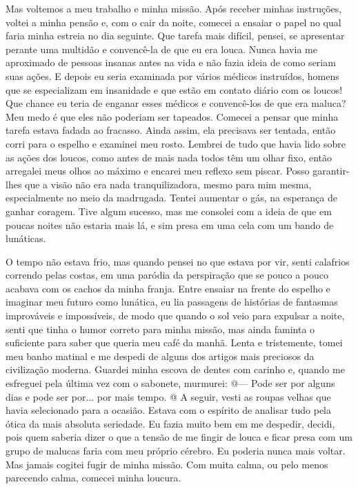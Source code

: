 Mas voltemos a meu trabalho e minha missão. Após receber minhas
instruções, voltei a minha pensão e, com o cair da noite, comecei a
ensaiar o papel no qual faria minha estreia no dia seguinte. Que tarefa
mais difícil, pensei, se apresentar perante uma multidão e convencê-la
de que eu era louca. Nunca havia me aproximado de pessoas insanas antes
na vida e não fazia ideia de como seriam suas ações. E depois eu seria
examinada por vários médicos instruídos, homens que se especializam em
insanidade e que estão em contato diário com os loucos! Que chance eu
teria de enganar esses médicos e convencê-los de que era maluca? Meu
medo é que eles não poderiam ser tapeados. Comecei a pensar que minha
tarefa estava fadada ao fracasso. Ainda assim, ela precisava ser
tentada, então corri para o espelho e examinei meu rosto. Lembrei de
tudo que havia lido sobre as ações dos loucos, como antes de mais nada
todos têm um olhar fixo, então arregalei meus olhos ao máximo e encarei
meu reflexo sem piscar. Posso garantir-lhes que a visão não era nada
tranquilizadora, mesmo para mim mesma, especialmente no meio da
madrugada. Tentei aumentar o gás, na esperança de ganhar coragem. Tive
algum sucesso, mas me consolei com a ideia de que em poucas noites não
estaria mais lá, e sim presa em uma cela com um bando de lunáticas.

O tempo não estava frio, mas quando pensei no que estava por vir, senti
calafrios correndo pelas costas, em uma paródia da perspiração que se
pouco a pouco acabava com os cachos da minha franja. Entre ensaiar na
frente do espelho e imaginar meu futuro como lunática, eu lia passagens
de histórias de fantasmas improváveis e impossíveis, de modo que quando
o sol veio para expulsar a noite, senti que tinha o humor correto para
minha missão, mas ainda faminta o suficiente para saber que queria meu
café da manhã. Lenta e tristemente, tomei meu banho matinal e me despedi
de alguns dos artigos mais preciosos da civilização moderna. Guardei
minha escova de dentes com carinho e, quando me esfreguei pela última
vez com o sabonete, murmurei: @--- Pode ser por alguns dias e pode ser
por... por mais tempo. @ A seguir, vesti as roupas velhas que havia
selecionado para a ocasião. Estava com o espírito de analisar tudo pela
ótica da mais absoluta seriedade. Eu fazia muito bem em me despedir,
decidi, pois quem saberia dizer o que a tensão de me fingir de louca e
ficar presa com um grupo de malucas faria com meu próprio cérebro. Eu
poderia nunca mais voltar. Mas jamais cogitei fugir de minha missão. Com
muita calma, ou pelo menos parecendo calma, comecei minha loucura.

